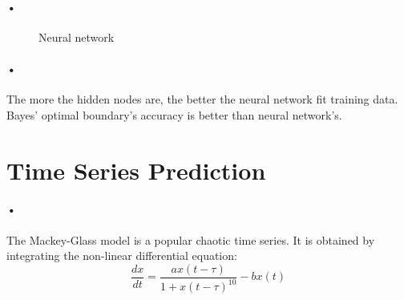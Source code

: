 \documentclass{article}
\begin{document}
\paragraph{•}
\begin{figure}[htbp]
 \centering
 \caption{Neural network}
\end{figure}
\paragraph{•}The more the hidden nodes are, the better the neural network fit training data. Bayes' optimal boundary's accuracy is better than neural network's.
\newpage 
\section{Time Series Prediction}
\paragraph{•}The Mackey-Glass model is a popular chaotic time series. It is obtained by integrating the non-linear differential equation:
\[
	\left. 
      \dfrac{dx}{dt}=
    \right.
    \left. 
      \dfrac{ax(t-\tau)}{1+x(t-\tau)^{10}}-bx(t)
    \right.
\]
\end{document}
